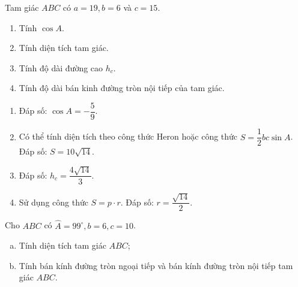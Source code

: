 \begin{bt}%
	Tam giác $ABC$ có $a=19, b=6$ và $c=15$.
	\begin{enumerate}
		\item Tính $\cos A$.
		\item Tính diện tích tam giác.
		\item Tính độ dài đường cao $h_c$.
		\item Tính độ dài bán kinh đường tròn nội tiếp của tam giác.
	\end{enumerate}
	\loigiai
	{
	\begin{enumerate}
		\item Đáp số: $\cos A=-\dfrac{5}{9}$.
		\item Có thể tính diện tích theo công thức Heron hoặc công thức $S=\dfrac{1}{2}b c\sin A$.\\
		Đáp số: $S=10\sqrt{14}$.
		\item Đáp số: $h_c=\dfrac{4\sqrt{14}}{3}$.
		\item Sử dụng công thức $S=p\cdot r$. Đáp số: $r=\dfrac{\sqrt{14}}{2}$.
	\end{enumerate}
	}
\end{bt}

\begin{bt}%
	Cho $ABC$ có $\widehat{A}=99^{\circ},b=6,c=10$. 
	\begin{enumerate}[a)]
		\item  Tính diện tích tam giác $ABC$;
		\item  Tính bán kính đường tròn ngoại tiếp và bán kính đường tròn nội tiếp tam giác $ABC$.
	\end{enumerate}
\end{bt}

